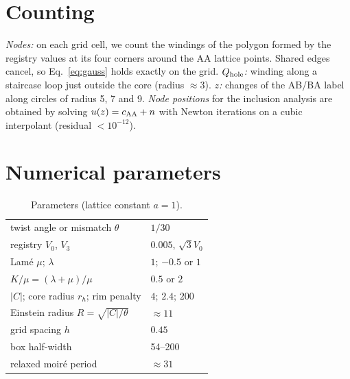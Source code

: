 \documentclass[prb,twocolumn,superscriptaddress,floatfix,10pt]{revtex4-2}
\begin{document}
\section{Counting}\label{app:count}
\emph{Nodes:} on each grid cell, we count the windings of the polygon formed by the registry values at its four corners around the AA lattice points. Shared edges cancel, so Eq.~\eqref{eq:gauss} holds exactly on the grid. \emph{$Q_{\rm hole}$:} winding along a staircase loop just outside the core (radius $\approx3$). \emph{$z$:} changes of the AB/BA label along circles of radius 5, 7 and 9. \emph{Node positions} for the inclusion analysis are obtained by solving $u(z)=c_{\rm AA}+n$ with Newton iterations on a cubic interpolant (residual $<10^{-12}$).

\section{Numerical parameters}\label{app:num}
\begin{table}[!htb]
\caption{Parameters (lattice constant $a=1$).}
\label{tab:param}
\begin{ruledtabular}\small
\begin{tabular}{ll}
twist angle or mismatch $\theta$ & $1/30$\\
registry $V_0$, $V_3$ & $0.005$, $\sqrt3V_0$\\
Lam\'e $\mu$; $\lambda$ & $1$; $-0.5$ or $1$\\
 $K/\mu=(\lambda+\mu)/\mu$ & $0.5$ or $2$\\
$|C|$; core radius $r_h$; rim penalty & $4$; $2.4$; $200$\\
Einstein radius $R=\sqrt{|C|/\theta}$ & $\approx11$\\
grid spacing $h$ & $0.45$\\
box half-width & 54--200\\
relaxed moir\'e period & $\approx31$\\
\end{tabular}
\end{ruledtabular}
\end{table}
\end{document}

